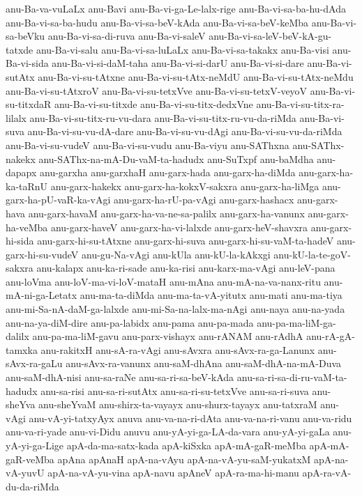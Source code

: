 {anu-Ba-va-vuLaLx
anu-Bavi
anu-Ba-vi-ga-Le-lalx-rige
anu-Ba-vi-sa-ba-hu-dAda
anu-Ba-vi-sa-ba-hudu
anu-Ba-vi-sa-beV-kAda
anu-Ba-vi-sa-beV-keMba
anu-Ba-vi-sa-beVku
anu-Ba-vi-sa-di-ruva
anu-Ba-vi-saleV
anu-Ba-vi-sa-leV-beV-kA-gu-tatxde
anu-Ba-vi-salu
anu-Ba-vi-sa-luLaLx
anu-Ba-vi-sa-takakx
anu-Ba-visi
anu-Ba-vi-sida
anu-Ba-vi-si-daM-taha
anu-Ba-vi-si-darU
anu-Ba-vi-si-dare
anu-Ba-vi-sutAtx
anu-Ba-vi-su-tAtxne
anu-Ba-vi-su-tAtx-neMdU
anu-Ba-vi-su-tAtx-neMdu
anu-Ba-vi-su-tAtxroV
anu-Ba-vi-su-tetxVve
anu-Ba-vi-su-tetxV-veyoV
anu-Ba-vi-su-titxdaR
anu-Ba-vi-su-titxde
anu-Ba-vi-su-titx-dedxVne
anu-Ba-vi-su-titx-ra-lilalx
anu-Ba-vi-su-titx-ru-vu-dara
anu-Ba-vi-su-titx-ru-vu-da-riMda
anu-Ba-vi-suva
anu-Ba-vi-su-vu-dA-dare
anu-Ba-vi-su-vu-dAgi
anu-Ba-vi-su-vu-da-riMda
anu-Ba-vi-su-vudeV
anu-Ba-vi-su-vudu
anu-Ba-viyu
anu-SAThxna
anu-SAThx-nakekx
anu-SAThx-na-mA-Du-vaM-ta-hadudx
anu-SuTxpf
anu-baMdha
anu-dapapx
anu-garxha
anu-garxhaH
anu-garx-hada
anu-garx-ha-diMda
anu-garx-ha-ka-taRnU
anu-garx-hakekx
anu-garx-ha-kokxV-sakxra
anu-garx-ha-liMga
anu-garx-ha-pU-vaR-ka-vAgi
anu-garx-ha-rU-pa-vAgi
anu-garx-hashacx
anu-garx-hava
anu-garx-havaM
anu-garx-ha-va-ne-sa-palilx
anu-garx-ha-vanunx
anu-garx-ha-veMba
anu-garx-haveV
anu-garx-ha-vi-lalxde
anu-garx-heV-shavxra
anu-garx-hi-sida
anu-garx-hi-su-tAtxne
anu-garx-hi-suva
anu-garx-hi-su-vaM-ta-hadeV
anu-garx-hi-su-vudeV
anu-gu-Na-vAgi
anu-kUla
anu-kU-la-kAkxgi
anu-kU-la-te-goV-sakxra
anu-kalapx
anu-ka-ri-sade
anu-ka-risi
anu-karx-ma-vAgi
anu-leV-pana
anu-loVma
anu-loV-ma-vi-loV-mataH
anu-mAna
anu-mA-na-va-nanx-ritu
anu-mA-ni-ga-Letatx
anu-ma-ta-diMda
anu-ma-ta-vA-yitutx
anu-mati
anu-ma-tiya
anu-mi-Sa-nA-daM-ga-lalxde
anu-mi-Sa-na-lalx-ma-nAgi
anu-naya
anu-na-yada
anu-na-ya-diM-dire
anu-pa-labidx
anu-pama
anu-pa-mada
anu-pa-ma-liM-ga-dalilx
anu-pa-ma-liM-gavu
anu-parx-vishayx
anu-rANAM
anu-rAdhA
anu-rA-gA-tamxka
anu-rakitxH
anu-sA-ra-vAgi
anu-sAvxra
anu-sAvx-ra-ga-Lanunx
anu-sAvx-ra-gaLu
anu-sAvx-ra-vanunx
anu-saM-dhAna
anu-saM-dhA-na-mA-Duva
anu-saM-dhA-nisi
anu-sa-raNe
anu-sa-ri-sa-beV-kAda
anu-sa-ri-sa-di-ru-vaM-ta-hadudx
anu-sa-risi
anu-sa-ri-sutAtx
anu-sa-ri-su-tetxVve
anu-sa-ri-suva
anu-sheYva
anu-sheYvaM
anu-shirx-ta-vayayx
anu-shurx-tayayx
anu-tatxraM
anu-vAgi
anu-vA-yi-tatxyAyx
anuva
anu-va-na-ri-dAta
anu-va-na-ri-vanu
anu-va-ridu
anu-va-ri-yade
anu-vi-Didu
anuvu
anu-yA-yi-ga-LA-da-vara
anu-yA-yi-gaLa
anu-yA-yi-ga-Lige
apA-da-ma-satx-kada
apA-kiSxka
apA-mA-gaR-meMba
apA-mA-gaR-veMba
apAna
apAnaH
apA-na-vAyu
apA-na-vA-yu-saM-yukatxM
apA-na-vA-yuvU
apA-na-vA-yu-vina
apA-navu
apAneV
apA-ra-ma-hi-manu
apA-ra-vA-du-da-riMda
}
